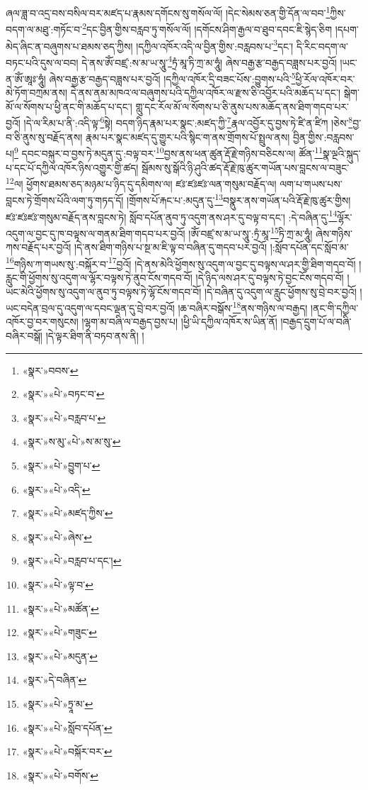 ཞལ་ཟླ་བ་འདྲ་བས་བསིལ་བར་མཛད་པ་རྣམས་དགོངས་སུ་གསོལ་ལོ། །དེང་སེམས་ཅན་གྱི་དོན་ལ་བབ་\footnote{«སྣར་»བབས་}ཀྱིས་བདག་ལ་མཐུ་:གཏོང་བ་\footnote{«སྣར་»«པེ་»བཏང་བ་}དང་བྱིན་གྱིས་བརླབ་ཏུ་གསོལ་ལོ། །དགོངས་ཤིག་རྒྱལ་བ་ཐུབ་དབང་ཇི་སྙེད་ཅིག །དཔག་མེད་ཞིང་ན་བཞུགས་པ་ཐམས་ཅད་ཀྱིས། །དཀྱིལ་འཁོར་འདི་ལ་བྱིན་གྱིས་:བརླབས་པ་\footnote{«སྣར་»«པེ་»བརླབ་པ་}དང་། དི་རིང་བདག་ལ་བཏང་པའི་དུས་ལ་བབ། དེ་ནས་ཨོཾ་བཛྲ་:ས་མ་ཡ་སཱུ་\footnote{«སྣར་»ས་མུ་«པེ་»ས་མ་སུ་}ཏྲཾ་མཱ་ཏི་ཀྲ་མ་ཧཱུཾ། ཞེས་བརྒྱ་རྩ་བརྒྱད་བཟླས་པར་བྱའོ། །ཡང་ན་ཨོཾ་ཨཱཿ་ཧཱུཾ། ཞེས་བརྒྱ་རྩ་བརྒྱད་བཟླས་པར་བྱའོ། །དཀྱིལ་འཁོར་དྲི་བཟང་པོས་:བྱུགས་པའི་\footnote{«སྣར་»«པེ་»བྱུག་པ་}ཕྱི་རོལ་འཁོར་བར་མེ་ཏོག་བཀྲམ་ནས། དེ་ནས་ནམ་མཁའ་ལ་བཞུགས་པའི་དཀྱིལ་འཁོར་ལ་རྫས་ཅི་འབྱོར་པའི་མཆོད་པ་དང་། སྒེག་མོ་ལ་སོགས་པ་ཕྱི་ནང་གི་མཆོད་པ་དང་། གླུ་དང་རོལ་མོ་ལ་སོགས་པ་ཅི་ནུས་པས་མཆོད་ནས་ཐིག་གདབ་པར་བྱའོ། །དེ་ལ་རིམ་པ་ནི་:འདི་ལྟ་\footnote{«སྣར་»«པེ་»འདི་}སྟེ། བདག་ཉིད་རྣམ་པར་སྣང་:མཛད་ཀྱི་\footnote{«སྣར་»«པེ་»མཛད་ཀྱིས་}རྣལ་འབྱོར་དུ་བྱས་ཏེ་ཛི་ན་ཛིཀ །ཅེས་\footnote{«སྣར་»«པེ་»ཞེས་}བྱ་བ་ཅི་ནུས་སུ་བརྗོད་ནས། རྣམ་པར་སྣང་མཛད་དུ་གྱུར་པའི་སྙིང་ག་ནས་གྲོགས་པོ་སྤྲུལ་ནས། བྱིན་གྱིས་:བརླབས་པ།\footnote{«སྣར་»«པེ་»བརླབ་པ་དང་།} དབང་བསྐུར་བ་བྱས་ཏེ་མདུན་དུ་:བལྟ་བར་\footnote{«སྣར་»«པེ་»ལྟ་བ་}བྱས་ནས་ཕན་ཚུན་རྡོ་རྗེ་གཉིས་བཅིངས་ལ། ཚོན་\footnote{«སྣར་»«པེ་»མཚོན་}སྣ་ལྔའི་སྐུད་པ་དང་པོ་དཀྱིལ་འཁོར་ཉིས་འགྱུར་གྱི་ཚད། སྦོམས་སུ་སྒོའི་ཉི་ཤུའི་ཚད་རྡོ་རྗེ་ཁུ་ཚུར་གཡོན་པས་བླངས་ལ་བཟུང་\footnote{«སྣར་»«པེ་»གཟུང་}ལ། ཕྱོགས་ཐམས་ཅད་མཉམ་པ་ཉིད་དུ་དམིགས་ལ། ཛཿ་ཛཿཛཿ་ལན་གསུམ་བརྗོད་ལ། ལག་པ་གཡས་པས་བླངས་ཏེ་གྲོགས་པོའི་ལག་ཏུ་གཏད་དོ། །གྲོགས་པོ་རྐང་པ་:མདུན་དུ་\footnote{«སྣར་»«པེ་»མདུན་}བསྣུར་ནས་གཡོན་པའི་རྡོ་རྗེ་ཁུ་ཚུར་གྱིས། ཛཿ་ཛཿཛཿ་གསུམ་བརྗོད་ནས་བླངས་ཏེ། སློབ་དཔོན་ནུབ་ཏུ་འདུག་ནས་ཤར་དུ་བལྟ་བ་དང་། :དེ་བཞིན་དུ་\footnote{«སྣར་»དེ་བཞིན་}ལྷོར་འདུག་ལ་བྱང་དུ་ཁ་བལྟས་ལ་གནམ་ཐིག་གདབ་པར་བྱའོ། །ཨོཾ་བཛྲ་ས་མ་ཡ་སཱུ་:ཏྲཾ་མཱ་\footnote{«སྣར་»«པེ་»ཏྲཱ་མ་}ཏི་ཀྲ་མ་ཧཱུཾ། ཞེས་གཉིས་ཀས་བརྗོད་པར་བྱའོ། །དེ་ནས་ཐིག་གཉིས་པ་སྔ་མ་ཇི་ལྟ་བ་བཞིན་དུ་གདབ་པར་བྱའོ། །:སློབ་དཔོན་དང་སློབ་མ་\footnote{«སྣར་»«པེ་»སློབ་དཔོན་}གཉིས་ཀ་གཡས་སུ་:བསྐོར་བ་\footnote{«སྣར་»«པེ་»བསྐོར་བར་}བྱའོ། །དེ་ནས་མེའི་ཕྱོགས་སུ་འདུག་ལ་བྱང་དུ་བལྟས་ལ་ཤར་གྱི་ཐིག་གདབ་བོ། །རླུང་གི་ཕྱོགས་སུ་འདུག་ལ་ལྷོར་བལྟས་ཏེ་ནུབ་ངོས་གདབ་བོ། །དེ་ཉིད་ལས་ཤར་དུ་བལྟས་ཏེ་བྱང་ངོས་གདབ་བོ། །ཡང་མེའི་ཕྱོགས་སུ་འདུག་ལ་ནུབ་ཏུ་བལྟས་ཏེ་ལྷོ་ངོས་གདབ་བོ། །དེ་བཞིན་དུ་འདུག་ལ་རླུང་ཕྱོགས་སུ་བྲེ་བར་བྱའོ། །ཡང་བདེན་བྲལ་དུ་འདུག་ལ་དབང་ལྡན་དུ་བྲེ་བར་བྱའོ། །ཆ་བཞིར་བསྒོས་\footnote{«སྣར་»«པེ་»བགོས་}ནས་གཉིས་ལ་བརྒྱད། །ནང་གི་དཀྱིལ་འཁོར་བྱ་བར་གསུངས། །ལྷག་མ་བཞི་ལ་བརྒྱད་བྱས་པ། །ཕྱི་ཡི་དཀྱིལ་འཁོར་ས་ཡིན་ནོ། །བརྒྱད་དྲུག་པོ་ལ་བཞི་བཞིར་བསྒོ། །དེ་ལྟར་ཐིག་ནི་བཏབ་ནས་ནི། །
